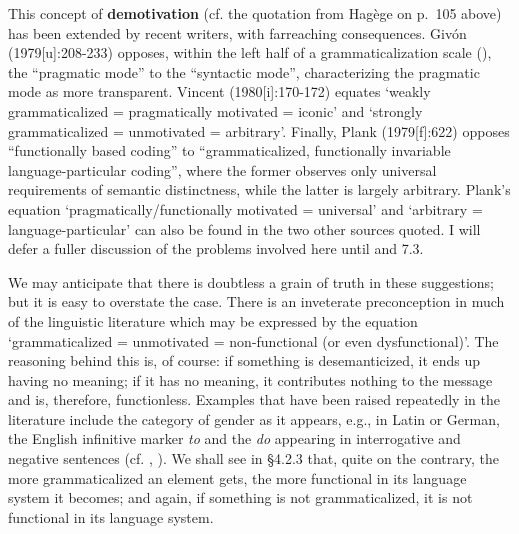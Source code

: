 This concept of \textbf{demotivation} (cf. the quotation from Hagège on p.~105 above) has been extended by recent writers, with farreaching consequences. Givón (1979[u]:208-233) opposes, within the left half of a grammaticalization scale (), the “pragmatic mode” to the “syntactic mode”, characterizing the pragmatic mode as more transparent. Vincent (1980[i]:170-172) equates ‘weakly grammaticalized = pragmatically motivated = iconic’ and ‘strongly grammaticalized = unmotivated = arbitrary’. Finally, Plank (1979[f]:622) opposes “functionally based coding” to “grammaticalized, functionally invariable language-particular coding”, where the former observes only universal requirements of semantic distinctness, while the latter is largely arbitrary. Plank's equation ‘pragmatically/functionally motivated = universal’ and ‘arbitrary = language-particular’ can also be found in the two other sources quoted. I will defer a fuller discussion of the problems involved here until  and 7.3.

We may anticipate that there is doubtless a grain of truth in these suggestions; but it is easy to overstate the case. There is an inveterate preconception in much of the linguistic literature which may be expressed by the equation ‘grammaticalized = unmotivated = non-functional (or even dysfunctional)’. The reasoning behind this is, of course: if something is desemanticized, it ends up having no meaning; if it has no meaning, it contributes nothing to the message and is, therefore, functionless. Examples that have been raised repeatedly in the literature include the category of gender as it appears, e.g., in Latin or German, the English infinitive marker \textit{to} and the \textit{do} appearing in interrogative and negative sentences (cf. \citet[97f]{Sapir1921} , \citet[421]{Lyons1968}). We shall see in §4.2.3 that, quite on the contrary, the more grammaticalized an element gets, the more functional in its language system it becomes; and again, if something is not grammaticalized, it is not functional in its language system.

